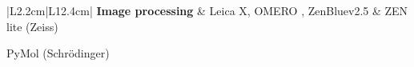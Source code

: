 \begin{table}[H]
\begin{threeparttable}
\begin{tabular}{|L{2.2cm}|L{12.4cm}|}
            \textbf{Image processing} & Leica X, OMERO \textbf{}\space, ZenBluev2.5 \& ZEN lite (Zeiss)\par
            PyMol (Schrödinger)  \\
            \hline
        \end{tabular}  
    \begin{tablenotes}\small \raggedright
    \item[a] \cite{sievers_fast_2011}
    \item[b] \cite{waterhouse_jalview_2009}
    \item[c] \cite{powell_phyre22_2025} 
    \item[d] \cite{abramson_accurate_2024}       
    \item[e] \cite{odum_deeploc_2024}      
    \item[f] \cite{walker_protein_2005}
    \item[g] \cite{gautier_heliquest_2008}
    \item[h] \cite{allan_omero_2012}
    \end{tablenotes}
\end{threeparttable}
\end{table}
